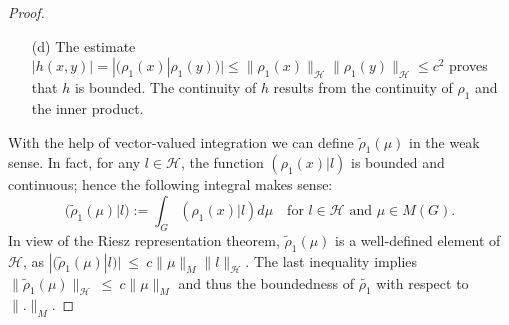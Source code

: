 \documentclass[graybox]{svmult}
\begin{document}
\begin{proof}
\begin{enumerate}
 Let $(f_{\alpha })_{\alpha \in I}$  be tight, $L^{1}$-bounded
and  vaguely  convergent  with
limit $\delta _{0}$ (i.e., a generalized ``Dirac sequence'');
then the following completes the proof of part~c):
\begin{gather*}
h(x,y) = \int^{}_{G\times G} h(t) (\delta _{x}\otimes \delta _{y}) dt =
\lim_{\alpha } \langle h , T_{x}f_{\alpha }\otimes T_{y}f_{\alpha }
\rangle =\\
= \lim_{\alpha } \langle \sigma _{\rho} , T_{x}f_{\alpha }\otimes
T_{y}f_{\alpha } \rangle = (\tilde{\rho}(\delta _{x})| \tilde{\rho}(\bar{\delta }_{y})) = (\tilde{\rho}(\delta _{x})| \tilde{\rho}(\delta _{y})).
\end{gather*}

\item[(d)] The estimate
$ |h(x,y)| = |(\rho_{1}(x)| \rho _{1}(y))| \leq %
\| \rho_{1}(x)\|_{\mathcal{H}}\|\rho_{1}(y)\|_{\mathcal{H}} \le  c^{2}$
proves that $h$ is bounded. The continuity of $h$ results from the
continuity of $\rho _{1}$ and the inner product.
\end{enumerate}

With the help of vector-valued integration we can define
$ \tilde{\rho}_{1}(\mu)$ in the weak sense. In fact, for any
$ l \in \mathcal{H}$, the function $ (\rho _{1}(x)| l)$ is bounded and continuous;
hence the following integral makes sense:
\[
\bigl( \tilde{\rho}_{1}(\mu )| l\bigr) :=
\int^{}_{G} (\rho_{1}(x)| l) d\mu \quad \text{for} \,\, l \in \mathcal{H}\text{ and }\mu \in M(G).
\]
In view of the  Riesz  representation  theorem, $\tilde{\rho}_{1}(\mu )$  is  a  well-defined element of $\mathcal{H}$,
as $|(\tilde{\rho}_1(\mu)|l)| \: \leq \: c  \| \mu \|_M
\| l \|_{\mathcal{H}}$. The last inequality implies
$\| \tilde{\rho}_1(\mu) \|_\mathcal{H} \: \leq \: c \|
\mu \|_M$ and thus the boundedness of $\widetilde{\rho_1}$ with
respect to $\| . \|_M$.




\end{proof}
\end{document}
